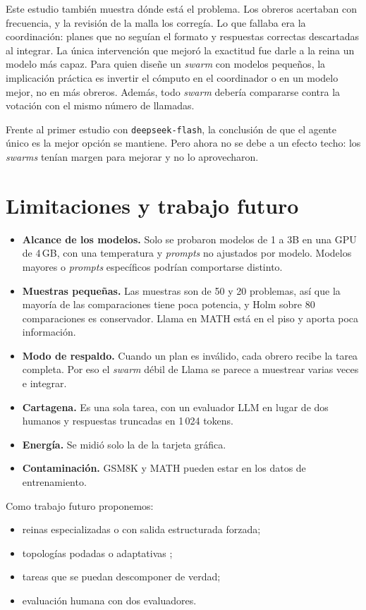 \documentclass[conference]{IEEEtran}
\begin{document}
Este estudio también muestra dónde está el problema. Los obreros acertaban con frecuencia, y la revisión de la malla los corregía. Lo que fallaba era la coordinación: planes que no seguían el formato y respuestas correctas descartadas al integrar. La única intervención que mejoró la exactitud fue darle a la reina un modelo más capaz. Para quien diseñe un \textit{swarm} con modelos pequeños, la implicación práctica es invertir el cómputo en el coordinador o en un modelo mejor, no en más obreros. Además, todo \textit{swarm} debería compararse contra la votación con el mismo número de llamadas.

Frente al primer estudio con \texttt{deepseek-flash}, la conclusión de que el agente único es la mejor opción se mantiene. Pero ahora no se debe a un efecto techo: los \textit{swarms} tenían margen para mejorar y no lo aprovecharon.

\section{Limitaciones y trabajo futuro}

\begin{itemize}
\item \textbf{Alcance de los modelos.} Solo se probaron modelos de 1 a 3B en una GPU de 4\,GB, con una temperatura y \textit{prompts} no ajustados por modelo. Modelos mayores o \textit{prompts} específicos podrían comportarse distinto.
\item \textbf{Muestras pequeñas.} Las muestras son de 50 y 20 problemas, así que la mayoría de las comparaciones tiene poca potencia, y Holm sobre 80 comparaciones es conservador. Llama en MATH está en el piso y aporta poca información.
\item \textbf{Modo de respaldo.} Cuando un plan es inválido, cada obrero recibe la tarea completa. Por eso el \textit{swarm} débil de Llama se parece a muestrear varias veces e integrar.
\item \textbf{Cartagena.} Es una sola tarea, con un evaluador LLM en lugar de dos humanos y respuestas truncadas en 1\,024 tokens.
\item \textbf{Energía.} Se midió solo la de la tarjeta gráfica.
\item \textbf{Contaminación.} GSM8K y MATH pueden estar en los datos de entrenamiento.
\end{itemize}
Como trabajo futuro proponemos:
\begin{itemize}
\item reinas especializadas o con salida estructurada forzada;
\item topologías podadas o adaptativas \cite{zhang2025agentprune,zhuge2024gptswarm};
\item tareas que se puedan descomponer de verdad;
\item evaluación humana con dos evaluadores.
\end{itemize}
\end{document}
